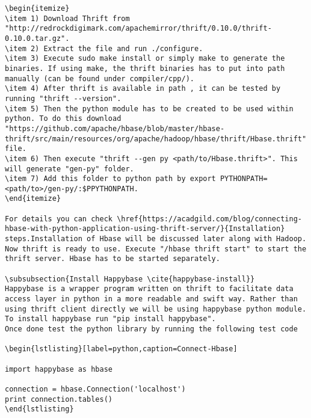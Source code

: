 \documentclass[9pt,twocolumn,twoside]{../../styles/osajnl}
\begin{document}
\begin{verbatim}
\begin{itemize}
\item 1) Download Thrift from "http://redrockdigimark.com/apachemirror/thrift/0.10.0/thrift-0.10.0.tar.gz".
\item 2) Extract the file and run ./configure.
\item 3) Execute sudo make install or simply make to generate the binaries. If using make, the thrift binaries has to put into path manually (can be found under compiler/cpp/).
\item 4) After thrift is available in path , it can be tested by running "thrift --version".
\item 5) Then the python module has to be created to be used within python. To do this download "https://github.com/apache/hbase/blob/master/hbase-thrift/src/main/resources/org/apache/hadoop/hbase/thrift/Hbase.thrift" file.
\item 6) Then execute "thrift --gen py <path/to/Hbase.thrift>". This will generate "gen-py" folder.
\item 7) Add this folder to python path by export PYTHONPATH=<path/to>/gen-py/:$PPYTHONPATH.
\end{itemize}

For details you can check \href{https://acadgild.com/blog/connecting-hbase-with-python-application-using-thrift-server/}{Installation} steps.Installation of Hbase will be discussed later along with Hadoop.
Now thrift is ready to use. Execute "/hbase thrift start" to start the thrift server. Hbase has to be started separately.

\subsubsection{Install Happybase \cite{happybase-install}}
Happybase is a wrapper program written on thrift to facilitate data access layer in python in a more readable and swift way. Rather than using thrift client directly we will be using happybase python module. To install happybase run "pip install happybase". 
Once done test the python library by running the following test code 

\begin{lstlisting}[label=python,caption=Connect-Hbase]

import happybase as hbase				

connection = hbase.Connection('localhost')
print connection.tables()
\end{lstlisting}




\end{verbatim}
\end{document}
